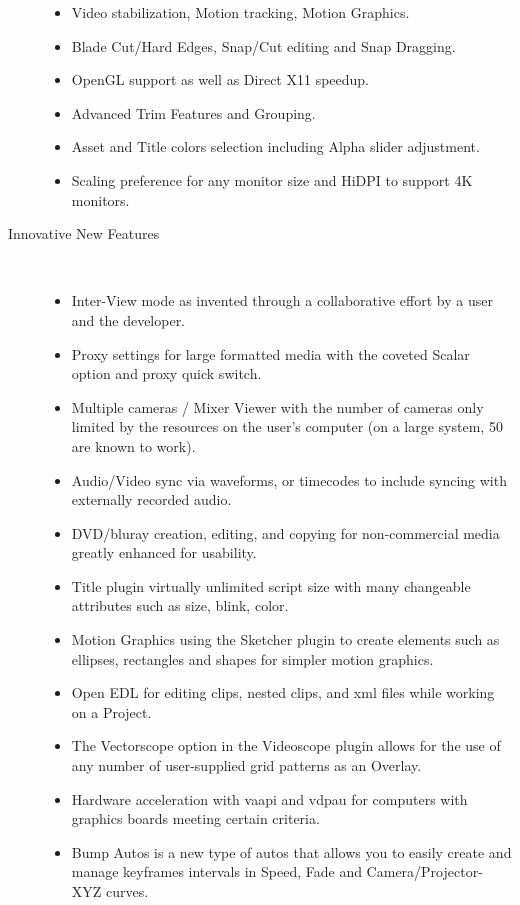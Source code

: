 \begin{description}
\begin{itemize}
                \item Video stabilization, Motion tracking, Motion Graphics.
                \item Blade Cut/Hard Edges, Snap/Cut editing and Snap Dragging.
                \item OpenGL support as well as Direct X11 speedup.
                \item Advanced Trim Features and Grouping.
                \item Asset and Title colors selection including Alpha slider adjustment.
                \item Scaling preference for any monitor size and HiDPI to support 4K monitors.
            \end{itemize}
            \item[Innovative New Features]~\\
                \begin{itemize}
                    \item Inter-View mode as invented through a collaborative effort by a user and the developer.
                    \item Proxy settings for large formatted media with the coveted Scalar option and proxy quick switch.
                    \item Multiple cameras / Mixer Viewer with the number of cameras only limited by the resources on the user’s computer (on a large system, 50 are known to work).
                    \item Audio/Video sync via waveforms, or timecodes to include syncing with externally recorded audio.
                    \item DVD/bluray creation, editing, and copying for non-commercial media greatly enhanced for usability.
                    \item Title plugin virtually unlimited script size with many changeable attributes such as size, blink, color.
                    \item Motion Graphics using the Sketcher plugin to create elements such as ellipses, rectangles and shapes for simpler motion graphics.
                    \item Open EDL for editing clips, nested clips, and xml files while working on a Project.
                    \item The Vectorscope option in the Videoscope plugin allows for the use of any number of user-supplied grid patterns as an Overlay.
                    \item Hardware acceleration with vaapi and vdpau for computers with graphics boards meeting certain criteria.
                    \item Bump Autos is a new type of autos that allows you to easily create and manage keyframes intervals in Speed, Fade and Camera/Projector-XYZ curves.
                \end{itemize}
\end{description}

